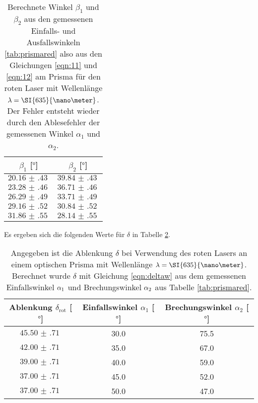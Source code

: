 \begin{table}
    \centering
    \caption{Berechnete Winkel $\beta_1$ und $\beta_2$ aus den gemessenen Einfalls- und Ausfallswinkeln \ref{tab:prismared} also aus den Gleichungen \eqref{eqn:11} und \eqref{eqn:12} am Prisma für den roten Laser mit Wellenlänge $\protect \lambda = \SI{635}{\nano\meter}$. Der Fehler entsteht wieder durch
    den Ablesefehler der gemessenen Winkel $\alpha_1$ und $\alpha_2$.}
    \label{tab:prismaredber}
    \begin{tabular}{c c}
        \toprule
        $\beta_1$ [$\si{\degree}$] & $\beta_2$ [$\si{\degree}$] \\
        \midrule
        $\SI{20.16(43)}{}$ & $\SI{39.84(43)}{}$\\
        $\SI{23.28(46)}{}$ & $\SI{36.71(46)}{}$\\  
        $\SI{26.29(49)}{}$ & $\SI{33.71(49)}{}$\\
        $\SI{29.16(52)}{}$ & $\SI{30.84(52)}{}$\\
        $\SI{31.86(55)}{}$ & $\SI{28.14(55)}{}$\\
        \bottomrule    
    \end{tabular}
\end{table}
Es ergeben sich die folgenden Werte für $\delta$ in Tabelle \ref{tab:keinm}.
\begin{table}
    \centering
    \caption{Angegeben ist die Ablenkung $\delta$ bei Verwendung des roten Lasers an einem optischen Prisma mit Wellenlänge $\protect \lambda = \SI{635}{\nano\meter}$. Berechnet wurde $\delta$ mit Gleichung \eqref{eqn:deltaw} aus dem gemessenen Einfallswinkel $\protect \alpha_1$ und Brechungswinkel $\protect \alpha_2$ aus Tabelle \ref{tab:prismared}. }
    \label{tab:keinm}
    \begin{tabular}{c | c c}
        \toprule
        Ablenkung $\delta_{\text{rot}}$ [$\si{\degree}$] & Einfallswinkel $\alpha_1$ [$\si{\degree}$] & Brechungswinkel $\alpha_2$ [$\si{\degree}$] \\
        \midrule
        $\SI{45.50(71)}{}$ & 30.0 & 75.5\\
        $\SI{42.00(71)}{}$ & 35.0 & 67.0\\  
        $\SI{39.00(71)}{}$ &  40.0 & 59.0\\
        $\SI{37.00(71)}{}$ & 45.0 & 52.0\\
        $\SI{37.00(71)}{}$ & 50.0 & 47.0\\
        \bottomrule    
    \end{tabular}
\end{table}

